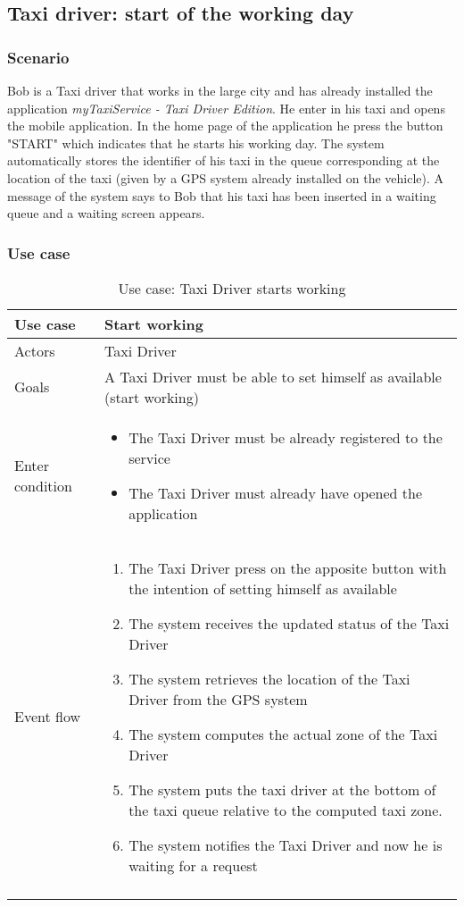 \subsection{Taxi driver: start of the working day}
\subsubsection{Scenario}
Bob is a Taxi driver that works in the large city and has already installed the application \textit{myTaxiService - Taxi Driver Edition}.
He enter in his taxi and opens the mobile application. In the home page of the application he press the button "START" which indicates that he starts his working day. The system automatically stores the identifier of his taxi in the queue corresponding at the location of the taxi (given by a GPS system already installed on the vehicle).
A message of the system says to Bob that his taxi has been inserted in a waiting queue and a waiting screen appears.

\subsubsection{Use case}
\begin{center}
\begin{longtable}{| p{} | p{} |} \hline
	Use case & \textbf{Start working} \\ \hline 
	Actors & Taxi Driver \\ \hline
	Goals & A Taxi Driver must be able to set himself as available (start working)  \\ \hline
	Enter condition & \begin{itemize}
						\item The Taxi Driver must be already registered to the service
						\item The Taxi Driver must already have opened the application
						\end{itemize} \\ \hline
	Event flow & \begin{enumerate}
					\item The Taxi Driver press on the apposite button with the intention of setting himself as available
					\item The system receives the updated status of the Taxi Driver
					\item The system retrieves the location of the Taxi Driver from the GPS system
					\item The system computes the actual zone of the Taxi Driver
					\item The system puts the taxi driver at the bottom of the taxi queue relative to the computed taxi zone.
					\item The system notifies the Taxi Driver and now he is waiting for a request
				\end{enumerate} \\ \hline
	\caption{Use case: Taxi Driver starts working}
\end{longtable}
\end{center}
